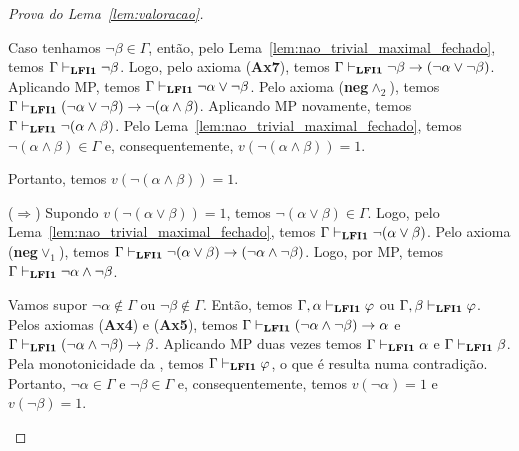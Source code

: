 \begin{proof}[Prova do Lema~\ref{lem:valoracao}]
\begin{provaporcasos}
\begin{adjustwidth}{1cm}{}
                        \noindent Caso tenhamos $\neg \beta \in \Gamma$, então, pelo Lema~\ref{lem:nao_trivial_maximal_fechado}, temos $\Gamma \vdash_{{\normalfont\textbf{LFI1}}{}} \neg \beta$. Logo, pelo axioma (\textbf{Ax7}), temos $\Gamma \vdash_{{\normalfont\textbf{LFI1}}{}} \neg \beta \to (\neg \alpha \lor \neg \beta)$. Aplicando MP, temos $\Gamma \vdash_{{\normalfont\textbf{LFI1}}{}} \neg \alpha \lor \neg \beta$. Pelo axioma (\textbf{neg}$\land_2$), temos $\Gamma \vdash_{{\normalfont\textbf{LFI1}}{}} (\neg \alpha \lor \neg \beta) \to \neg (\alpha \land \beta)$. Aplicando MP novamente, temos $\Gamma \vdash_{{\normalfont\textbf{LFI1}}{}} \neg (\alpha \land \beta)$. Pelo Lema~\ref{lem:nao_trivial_maximal_fechado}, temos $\neg (\alpha \land \beta) \in \Gamma$ e, consequentemente, $v(\neg (\alpha \land \beta)) = 1$.

                        Portanto, temos $v(\neg (\alpha \land \beta)) = 1$.

                    \end{adjustwidth}


                    \begin{adjustwidth}{1cm}{}
                        
                        \noindent ($\Longrightarrow$) Supondo $v(\neg (\alpha \lor \beta)) = 1$, temos $\neg (\alpha \lor \beta) \in \Gamma$. Logo, pelo Lema~\ref{lem:nao_trivial_maximal_fechado}, temos $\Gamma \vdash_{{\normalfont\textbf{LFI1}}{}} \neg (\alpha \lor \beta)$. Pelo axioma (\textbf{neg}$\lor_1$), temos $\Gamma \vdash_{{\normalfont\textbf{LFI1}}{}} \neg (\alpha \lor \beta) \to (\neg \alpha \land \neg \beta)$. Logo, por MP, temos $\Gamma \vdash_{{\normalfont\textbf{LFI1}}{}} \neg \alpha \land \neg \beta$.

                        \noindent Vamos supor $\neg \alpha \not \in \Gamma$ ou $\neg \beta \not \in \Gamma$. Então, temos $\Gamma, \alpha \vdash_{{\normalfont\textbf{LFI1}}{}} \varphi$ ou $\Gamma, \beta \vdash_{{\normalfont\textbf{LFI1}}{}} \varphi$. Pelos axiomas (\textbf{Ax4}) e (\textbf{Ax5}), temos $\Gamma \vdash_{{\normalfont\textbf{LFI1}}{}} (\neg \alpha \land \neg \beta) \to \alpha$ e $\Gamma \vdash_{{\normalfont\textbf{LFI1}}{}} (\neg \alpha \land \neg \beta) \to \beta$. Aplicando MP duas vezes temos $\Gamma \vdash_{{\normalfont\textbf{LFI1}}{}} \alpha$ e $\Gamma \vdash_{{\normalfont\textbf{LFI1}}{}} \beta$. Pela monotonicidade da \lfium{}, temos $\Gamma \vdash_{{\normalfont\textbf{LFI1}}{}} \varphi$, o que é resulta numa contradição. Portanto, $\neg \alpha \in \Gamma$ e $\neg \beta \in \Gamma$ e, consequentemente, temos $v(\neg \alpha) = 1$ e $v(\neg \beta) = 1$. 
                        

\end{adjustwidth}
\end{provaporcasos}
\end{proof}
